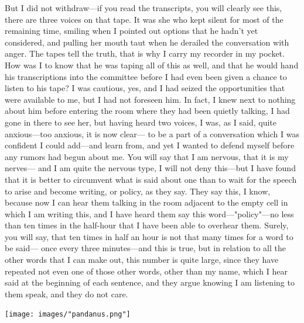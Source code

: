 \documentclass[
]{memoir}
\begin{document}
But I did not withdraw---if you read the transcripts, you will clearly
see this, there are three voices on that tape. It was she who kept
silent for most of the remaining time, smiling when I pointed out
options that he hadn't yet considered, and pulling her mouth taut when
he derailed the conversation with anger. The tapes tell the truth, that
is why I carry my recorder in my pocket. How was I to know that he was
taping all of this as well, and that he would hand his transcriptions
into the committee before I had even been given a chance to listen to
his tape? I was cautious, yes, and I had seized the opportunities that
were available to me, but I had not foreseen him. In fact, I knew next
to nothing about him before entering the room where they had been
quietly talking, I had gone in there to see her, but having heard two
voices, I was, as I said, quite anxious---too anxious, it is now
clear--- to be a part of a conversation which I was confident I could
add---and learn from, and yet I wanted to defend myself before any
rumors had begun about me. You will say that I am nervous, that it is my
nerves--- and I am quite the nervous type, I will not deny this---but I
have found that it is better to circumvent what is said about one than
to wait for the speech to arise and become writing, or policy, as they
say. They say this, I know, because now I can hear them talking in the
room adjacent to the empty cell in which I am writing this, and I have
heard them say this word---"policy"---no less than ten times in the
half-hour that I have been able to overhear them. Surely, you will say,
that ten times in half an hour is not that many times for a word to be
said--- once every three minutes---and this is true, but in relation to
all the other words that I can make out, this number is quite large,
since they have repeated not even one of those other words, other than
my name, which I hear said at the beginning of each sentence, and they
argue knowing I am listening to them speak, and they do not care.

\begin{center}\texttt{[image: images/"pandanus.png"]}\end{center}
\end{document}
